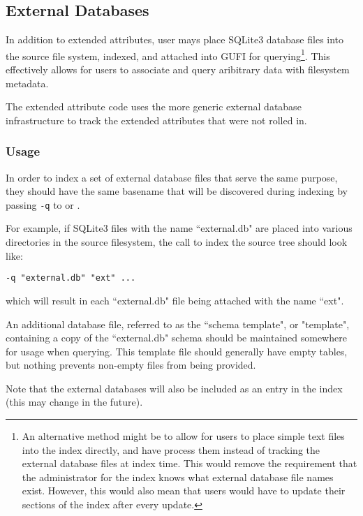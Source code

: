 \subsection{External Databases}
In addition to extended attributes, user mays place SQLite3 database
files into the source file system, indexed, and attached into GUFI for
querying\footnote{An alternative method might be to allow for users to
place simple text files into the index directly, and have \gufiquery
process them instead of tracking the external database files at index
time. This would remove the requirement that the administrator for the
index knows what external database file names exist. However, this
would also mean that users would have to update their sections of the
index after every update.}. This effectively allows for users to
associate and query aribitrary data with filesystem metadata.

The extended attribute code uses the more generic external database
infrastructure to track the extended attributes that were not rolled
in.

\subsubsection{Usage}
In order to index a set of external database files that serve the same
purpose, they should have the same basename that will be discovered
during indexing by passing \texttt{-q} to \gufidirindex or
\gufidirtrace.

For example, if SQLite3 files with the name ``external.db" are placed
into various directories in the source filesystem, the call to index
the source tree should look like:

\hspace*{\fill} \gufidirindex \texttt{-q "external.db" "ext" ...} \hspace*{\fill}

which will result in each ``external.db" file being attached with the
name ``ext".

An additional database file, referred to as the ``schema template", or
"template", containing a copy of the ``external.db" schema should be
maintained somewhere for usage when querying. This template file
should generally have empty tables, but nothing prevents non-empty
files from being provided.

Note that the external databases will also be included as an entry in
the index (this may change in the future).
